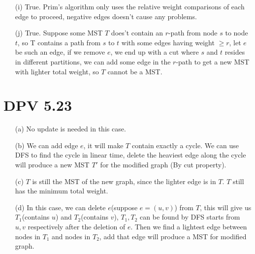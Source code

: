 \documentclass[twoside]{homework}
\begin{document}
\begin{enumerate}
	\item [(i)] True. Prim's algorithm only uses the relative weight comparisons of each edge to proceed, negative edges doesn't cause any problems.
	\item [(j)] True. Suppose some MST $T$ does't contain an $r$-path from node $s$ to node $t$, so T contains a path from $s$ to $t$ with some edges having weight $\geq r$, let $e$ be such an edge, if we remove $e$, we end up with a cut where $s$ and $t$ resides in different partitions, we can add some edge in the $r$-path to get a new MST with lighter total weight, so $T$ cannot be a MST.
\end{enumerate}

\section{DPV 5.23}
\begin{enumerate}
	\item [(a)] No update is needed in this case.
	\item [(b)] We can add edge $e$, it will make $T$ contain exactly a cycle. We can use DFS to find the cycle in linear time, delete the heaviest edge along the cycle will produce a new MST $T'$ for the modified graph (By cut property).
	\item [(c)] $T$ is still the MST of the new graph, since the lighter edge is in $T$. $T$ still has the minimum total weight.
	\item [(d)] In this case, we can delete $e$(suppose $e=(u, v)$) from $T$, this will give us $T_1$(contains $u$) and $T_2$(contains $v$), $T_1, T_2$ can be found by DFS starts from $u, v$ respectively after the deletion of $e$. Then we find a lightest edge between nodes in $T_1$ and nodes in $T_2$, add that edge will produce a MST for modified graph.
\end{enumerate}
\end{document}
